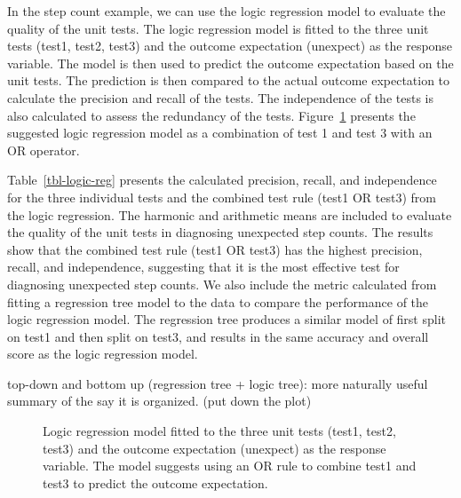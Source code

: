 \documentclass[
  12pt,
]{interact}
\begin{document}
In the step count example, we can use the logic regression model to
evaluate the quality of the unit tests. The logic regression model is
fitted to the three unit tests (test1, test2, test3) and the outcome
expectation (unexpect) as the response variable. The model is then used
to predict the outcome expectation based on the unit tests. The
prediction is then compared to the actual outcome expectation to
calculate the precision and recall of the tests. The independence of the
tests is also calculated to assess the redundancy of the tests.
Figure~\ref{fig-logic-reg} presents the suggested logic regression model
as a combination of test 1 and test 3 with an OR operator.

Table~\ref{tbl-logic-reg} presents the calculated precision, recall, and
independence for the three individual tests and the combined test rule
(test1 OR test3) from the logic regression. The harmonic and arithmetic
means are included to evaluate the quality of the unit tests in
diagnosing unexpected step counts. The results show that the combined
test rule (test1 OR test3) has the highest precision, recall, and
independence, suggesting that it is the most effective test for
diagnosing unexpected step counts. We also include the metric calculated
from fitting a regression tree model to the data to compare the
performance of the logic regression model. The regression tree produces
a similar model of first split on test1 and then split on test3, and
results in the same accuracy and overall score as the logic regression
model.

top-down and bottom up (regression tree + logic tree): more naturally
useful summary of the say it is organized. (put down the plot)

\label{cell-fig-logic-reg}
\begin{figure}[H]


\caption{\label{fig-logic-reg}Logic regression model fitted to the three
unit tests (test1, test2, test3) and the outcome expectation (unexpect)
as the response variable. The model suggests using an OR rule to combine
test1 and test3 to predict the outcome expectation.}

\end{figure}%
\end{document}
